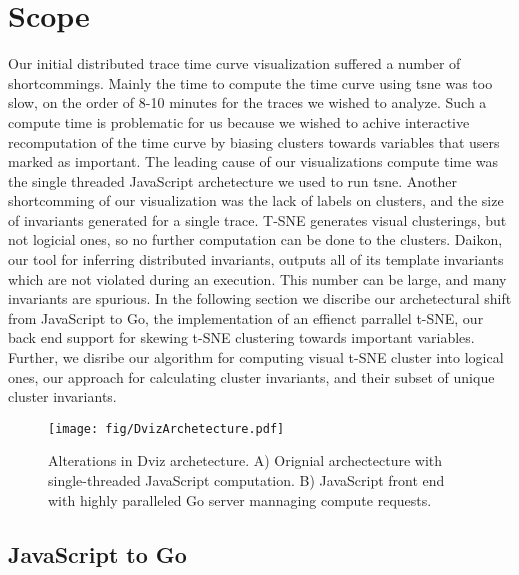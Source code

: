 \section{Scope}
\label{sec:scope}

Our initial distributed trace time curve visualization suffered a number of
shortcommings. Mainly the time to compute the time curve using tsne was too
slow, on the order of 8-10 minutes for the traces we wished to analyze. Such a
compute time is problematic for us because we wished to achive interactive
recomputation of the time curve by biasing clusters towards variables that
users marked as important. The leading cause of our visualizations compute time
was the single threaded JavaScript archetecture we used to run tsne. Another
shortcomming of our visualization was the lack of labels on clusters, and the
size of invariants generated for a single trace. T-SNE generates visual
clusterings, but not logicial ones, so no further computation can be done to
the clusters. Daikon, our tool for inferring distributed invariants, outputs
all of its template invariants which are not violated during an execution. This
number can be large, and many invariants are spurious. In the following section
we discribe our archetectural shift from JavaScript to Go, the implementation
of an effienct parrallel t-SNE, our back end support for skewing t-SNE
clustering towards important variables. Further, we disribe our algorithm for
computing visual t-SNE cluster into logical ones, our approach for calculating
cluster invariants, and their subset of unique cluster invariants.

\begin{figure}[t]
\centering
    \texttt{[image: fig/DvizArchetecture.pdf]}

    \caption{Alterations in Dviz archetecture. A) Orignial
    archectecture with single-threaded JavaScript computation. B)
    JavaScript front end with highly paralleled Go server mannaging
    compute requests.}

    \label{fig:dviz-archetecture}
\end{figure}

\subsection{JavaScript to Go}
\label{sec:js2go}

